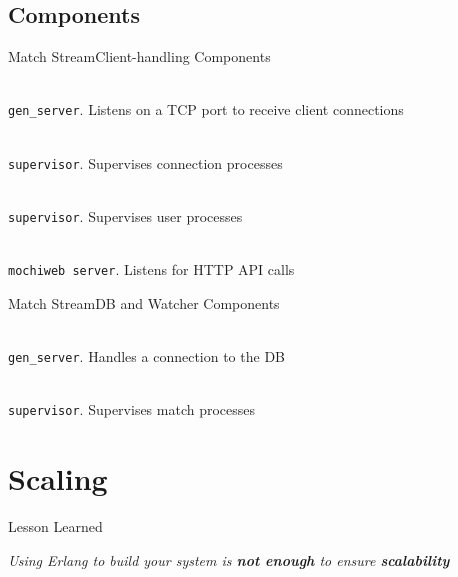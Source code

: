 \documentclass[utf8]{beamer}
\begin{document}
\subsection{Components}
\begin{frame}{Match Stream}{Client-handling Components}
	\begin{description}
		\item<+->[client\_listener]\ \\
			\texttt{gen\_server}. Listens on a TCP port to receive client connections
		\item<+->[client\_sup]\ \\
			\texttt{supervisor}. Supervises connection processes
		\item<+->[user\_sup]\ \\
			\texttt{supervisor}. Supervises user processes
		\item<+->[web]\ \\
			\texttt{mochiweb server}. Listens for HTTP API calls
	\end{description}
\end{frame}
\begin{frame}{Match Stream}{DB and Watcher Components}
	\begin{description}
		\item<+->[db]\ \\
			\texttt{gen\_server}. Handles a connection to the DB
		\item<+->[match\_sup]\ \\
			\texttt{supervisor}. Supervises match processes
	\end{description}
\end{frame}

\section{Scaling}
\begin{frame}{Lesson Learned}
	\begin{center}
		\huge \emph{Using Erlang to build your system is \textbf{not enough} to ensure \textbf{scalability}}
	\end{center}
\end{frame}
\end{document}
